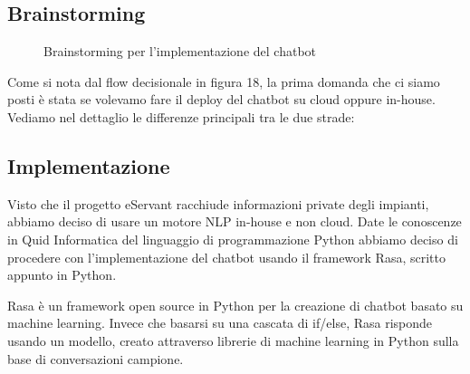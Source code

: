 \subsection{Brainstorming}
\begin{figure}[htp]
    \centering  
    \caption{Brainstorming per l'implementazione del chatbot}
\end{figure}


Come si nota dal flow decisionale in figura 18, la prima domanda che ci siamo posti è stata se volevamo fare il deploy del
chatbot su cloud oppure in-house.\\

Vediamo nel dettaglio le differenze principali tra le due strade:\\

\subsection{Implementazione}

\begin{figure}[htp]
    \centering  
\end{figure}

Visto che il progetto eServant racchiude informazioni private degli impianti, abbiamo deciso di usare un motore
NLP in-house e non cloud.
Date le conoscenze in Quid Informatica del linguaggio di programmazione Python abbiamo deciso di procedere
con l'implementazione del chatbot usando il framework Rasa, scritto appunto in Python.

Rasa è un framework open source in Python per la creazione di chatbot basato su machine learning.
Invece che basarsi su una cascata di if/else, Rasa risponde usando un modello, creato attraverso
librerie di machine learning in Python sulla base di conversazioni campione.
